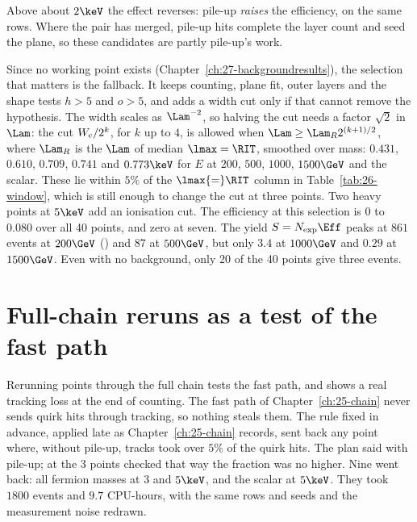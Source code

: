 Above about $2\keV$ the effect reverses: pile-up \emph{raises} the efficiency, on the same rows. Where the pair has merged, pile-up
hits complete the layer count and seed the plane, so these candidates are partly pile-up's work.

Since no working point exists (Chapter~\ref{ch:27-backgroundresults}), the selection that matters is the fallback. It keeps counting, plane fit, outer layers and the shape tests
$h>5$ and $o>5$, and adds a width cut only if that cannot remove the hypothesis. The width scales as $\Lam^{-2}$, so halving the cut needs a factor $\sqrt2$ in $\Lam$: the cut $W_{\rm c}/2^k$, for $k$ up to $4$, is allowed when $\Lam\ge\Lam_R2^{(k+1)/2}$, where $\Lam_R$ is the $\Lam$ of median $\lmax=\RIT$, smoothed over mass: $0.431$, $0.610$, $0.709$, $0.741$ and $0.773\keV$ for $E$ at $200$, $500$, $1000$, $1500\GeV$ and the scalar. These lie within $5\%$ of the $\lmax{=}\RIT$ column in Table~\ref{tab:26-window}, which is still enough to change the cut at three points. Two heavy points at $5\keV$ add an ionisation cut. The efficiency at this selection is $0$ to $0.080$ over all 40
points, and zero at seven.
The yield $S=N_{\rm exp}\Eff$ peaks at $861$ events at $200\GeV$ (\EST) and $87$ at $500\GeV$, but only $3.4$ at $1000\GeV$ and $0.29$ at $1500\GeV$. Even with no background, only 20 of the 40 points give three events.

\section{Full-chain reruns as a test of the fast path}\label{sec:26-fullchain}

Rerunning points through the full chain tests the fast path, and shows a real tracking loss at the end of counting. The fast path of Chapter~\ref{ch:25-chain} never sends quirk hits through tracking, so nothing steals them. The rule fixed in advance, applied late as Chapter~\ref{ch:25-chain} records, sent back any point where, without pile-up, tracks took
over $5\%$ of the quirk hits. The plan said with pile-up; at the 3 points checked that way the fraction was no higher. Nine went back: all fermion masses at $3$ and $5\keV$, and the scalar at $5\keV$. They took $1800$ events and $9.7$ CPU-hours, with the same rows and
seeds and the measurement noise redrawn.

